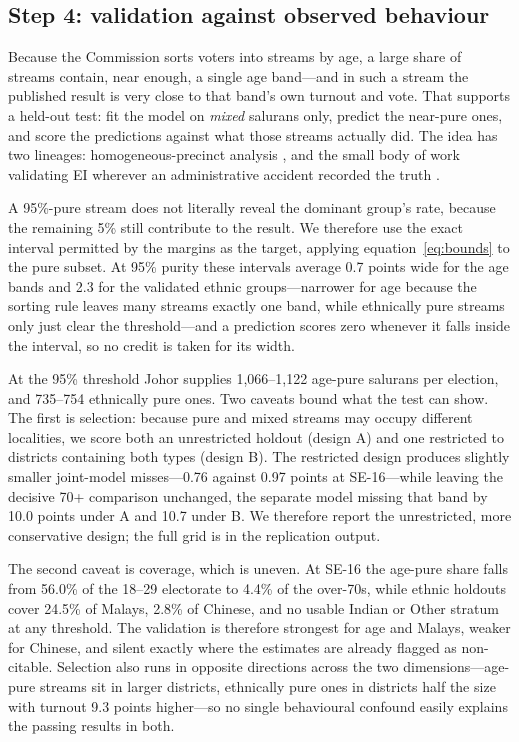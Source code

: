 \documentclass[11pt]{article}
\begin{document}
\subsection{Step 4: validation against observed behaviour}
\label{sec:strategy-groundtruth}

Because the Commission sorts voters into streams by age, a large share of streams contain, near enough, a single age band---and in such a stream the published result is very close to that band's own turnout and vote. That supports a held-out test: fit the model on \emph{mixed} salurans only, predict the near-pure ones, and score the predictions against what those streams actually did. The idea has two lineages: homogeneous-precinct analysis \cite{grofman1992}, and the small body of work validating EI wherever an administrative accident recorded the truth \cite{hudson2010,plesciadesio2018,park2014}.

A 95\%-pure stream does not literally reveal the dominant group's rate, because the remaining 5\% still contribute to the result. We therefore use the exact interval permitted by the margins as the target, applying equation~\eqref{eq:bounds} to the pure subset. At 95\% purity these intervals average 0.7 points wide for the age bands and 2.3 for the validated ethnic groups---narrower for age because the sorting rule leaves many streams exactly one band, while ethnically pure streams only just clear the threshold---and a prediction scores zero whenever it falls inside the interval, so no credit is taken for its width.

At the 95\% threshold Johor supplies 1,066--1,122 age-pure salurans per election, and 735--754 ethnically pure ones. Two caveats bound what the test can show. The first is selection: because pure and mixed streams may occupy different localities, we score both an unrestricted holdout (design A) and one restricted to districts containing both types (design B). The restricted design produces slightly smaller joint-model misses---0.76 against 0.97 points at SE-16---while leaving the decisive 70+ comparison unchanged, the separate model missing that band by 10.0 points under A and 10.7 under B. We therefore report the unrestricted, more conservative design; the full grid is in the replication output.

The second caveat is coverage, which is uneven. At SE-16 the age-pure share falls from 56.0\% of the 18--29 electorate to 4.4\% of the over-70s, while ethnic holdouts cover 24.5\% of Malays, 2.8\% of Chinese, and no usable Indian or Other stratum at any threshold. The validation is therefore strongest for age and Malays, weaker for Chinese, and silent exactly where the estimates are already flagged as non-citable. Selection also runs in opposite directions across the two dimensions---age-pure streams sit in larger districts, ethnically pure ones in districts half the size with turnout 9.3 points higher---so no single behavioural confound easily explains the passing results in both.
\end{document}
